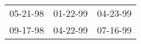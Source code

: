 \begin{supertabular}{p{0.33\columnwidth}p{0.33\columnwidth}p{0.33\columnwidth}}
 05-21-98\textsuperscript{} &  01-22-99\textsuperscript{} &  04-23-99\textsuperscript{} \\
 09-17-98\textsuperscript{} &  04-22-99\textsuperscript{} &  07-16-99\textsuperscript{} \\
\end{supertabular}
